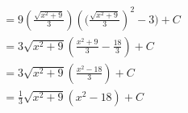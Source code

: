 \documentclass[preview]{standalone}
\begin{document}
\begin{align*}
&=9(\frac{\sqrt{x^2+9}}{3})({(\frac{\sqrt{x^2+9}}{3}})^2-3)+C \\ &=3\sqrt{x^2+9}(\frac{x^2+9}{3}-\frac{18}{3})+C \\ &=3\sqrt{x^2+9}(\frac{x^2-18}{3})+C \\ &=\frac{1}{3}\sqrt{x^2+9}(x^2-18)+C
\end{align*}
\end{document}
